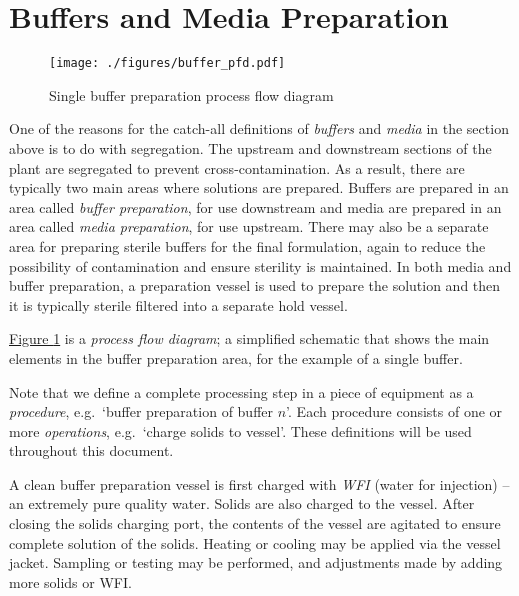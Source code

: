 \section{Buffers and Media Preparation}\label{SS.buffmedprep}
\begin{figure}
    \centering
    \texttt{[image: ./figures/buffer\_pfd.pdf]}
    \caption{Single buffer preparation process flow diagram}
    \label{fig.pfd}
\end{figure}
One of the reasons for the catch-all definitions of \emph{buffers} and
\emph{media} in the section above is to do with segregation.
The upstream and downstream sections of the plant are segregated to prevent
cross-contamination.
As a result, there are typically two main areas where solutions are prepared.
Buffers are prepared in an area called \emph{buffer preparation}, for use
downstream and media are prepared in an area called \emph{media preparation},
for use upstream.
There may also be a separate area for preparing sterile buffers for the final
formulation, again to reduce the possibility of contamination and ensure
sterility is maintained.
In both media and buffer preparation, a preparation vessel is used to prepare
the solution and then it is typically sterile filtered into a separate hold
vessel.

\hyperref[fig.pfd]{Figure \ref*{fig.pfd}} is a \emph{process flow diagram}; a
simplified schematic that shows the main elements in the buffer preparation
area, for the example of a single buffer.

Note that we define a complete processing step in a piece of equipment as a
\emph{procedure}, e.g.\ `buffer preparation of buffer $n$'.
Each procedure consists of one or more \emph{operations}, e.g.\ `charge solids
to vessel'.
These definitions will be used throughout this document. 

A clean buffer preparation vessel is first charged with \emph{WFI} (water for
injection) -- an extremely pure quality water.
Solids are also charged to the vessel.
After closing the solids charging port, the contents of the vessel are
agitated to ensure complete solution of the solids.
Heating or cooling may be applied via the vessel jacket.
Sampling or testing may be performed, and adjustments made by adding more 
solids or WFI.

